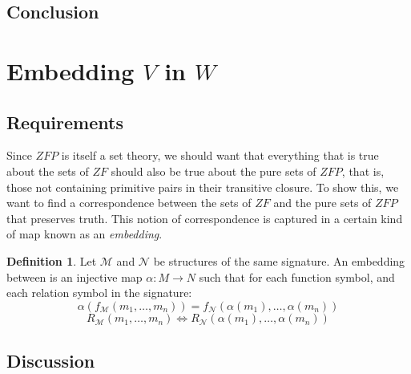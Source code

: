 \documentclass[11pt]{report}
\theoremstyle{definition}
\theoremstyle{theorem}
\theoremstyle{lemma}
\newtheorem{definition}{Definition}[section]
\begin{document}
\subsection{Conclusion}

\section{Embedding $V$ in $W$}\label{embedding}
\subsection{Requirements}

Since $\mathit{ZFP}$ is itself a set theory, we should want that everything that is true about the sets of $\mathit{ZF}$ should also be true about the pure sets of $\mathit{ZFP}$, that is, those not containing primitive pairs in their transitive closure. To show this, we want to find a correspondence between the sets of $\mathit{ZF}$ and the pure sets of $\mathit{ZFP}$ that preserves truth. This notion of correspondence is captured in a certain kind of map known as an \emph{embedding}.

\begin{definition}\label{embedding}
Let $\mathcal{M}$ and $\mathcal{N}$ be structures of the same signature. An embedding between is an injective map $\alpha:M\to N$ such that for each function symbol, and each relation symbol in the signature:
 $$\alpha(f_{\mathcal{M}}(m_1,\ldots,m_n)) = f_{\mathcal{N}}(\alpha(m_1),\ldots,\alpha(m_n))$$
 $$R_\mathcal{M}(m_1,\ldots,m_n) \iff R_\mathcal{N}(\alpha(m_1),\ldots,\alpha(m_n))$$
\end{definition}

\subsection{Discussion}
\end{document}
